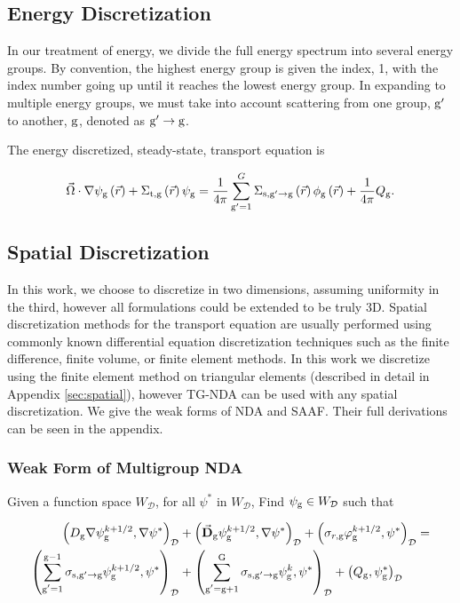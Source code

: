 \subsection{Energy Discretization}
In our treatment of energy, we divide the full energy spectrum into several energy groups. By convention, the highest energy group is given the index, 1, with the index number going up until it reaches the lowest energy group. In expanding to multiple energy groups, we must take into account scattering from one group, $\mathrm{g}'$ to another, $\mathrm{g}$, denoted as $\mathrm{g}' \rightarrow \mathrm{g} $. 

The energy discretized, steady-state, transport equation is

 \begin{equation}
  \vec{\Omega} \cdot \nabla \psi_{\mathrm{g}} \left(\vec{r}\right)+ \Sigma_{\mathrm{t}, \mathrm{g}}\left(\vec{r}\right)\psi_{\mathrm{g}} = \frac{1}{4 \pi} \sum\limits_{\mathrm{g}'=1}^{G}\Sigma_{\mathrm{s}, \mathrm{g}' \rightarrow \mathrm{g}}\left(\vec{r}\right) \phi_{\mathrm{g}}\left(\vec{r}\right) + \frac{1}{4 \pi} Q_{\mathrm{g}}.
  \label{eq:transport-energy}
 \end{equation}


\subsection{Spatial Discretization}
In this work, we choose to discretize in two dimensions, assuming uniformity in the third, however all formulations could be extended to be truly 3D. Spatial discretization methods for the transport equation are usually performed using commonly known differential equation discretization techniques such as the finite difference, finite volume, or finite element methods. In this work we discretize using the finite element method on triangular elements (described in detail in Appendix \ref{sec:spatial}), however TG-NDA can be used with any spatial discretization. We give the weak forms of NDA and SAAF. Their full derivations can be seen in the appendix. 



\subsubsection{Weak Form of Multigroup NDA}

Given a function space $W_\mathcal{D}$, for all $\psi^*$ in $W_\mathcal{D}$, Find $\psi_{\mathrm{g}} \in W_\mathcal{D}$ such that

  \begin{align}
  \left(D_{\mathrm{g}} \nabla \psi_{\mathrm{g}}^{k+1/2}, \nabla \psi^*\right)_\mathcal{D} &+ \left(\vec{\bf{D}}_{\mathrm{g}} \psi_{\mathrm{g}}^{k+1/2} , \nabla \psi^*\right)_\mathcal{D} +  \left(\sigma_{r,\mathrm{g}} \varphi_{\mathrm{g}}^{k+1/2}, \psi^*\right)_\mathcal{D} = \nonumber \\
   \left(\sum\limits_{\substack{\mathrm{g}'=1}}^{\mathrm{g-1}} \sigma_{\mathrm{s},\mathrm{g}' \to\mathrm{g}}\psi_{\mathrm{g}}^{k+1/2}, \psi^*\right)_\mathcal{D} &+ \left(\sum\limits_{\substack{\mathrm{g}'=\mathrm{g}+1}}^{\mathrm{G}} \sigma_{\mathrm{s},\mathrm{g}' \to\mathrm{g}}\psi_{\mathrm{g}}^{k}, \psi^*\right)_\mathcal{D} 
  + \left(Q_{\mathrm{g}}, \psi^*_{\mathrm{g}}\right)_\mathcal{D}  \label{k1/2}
  \end{align}


